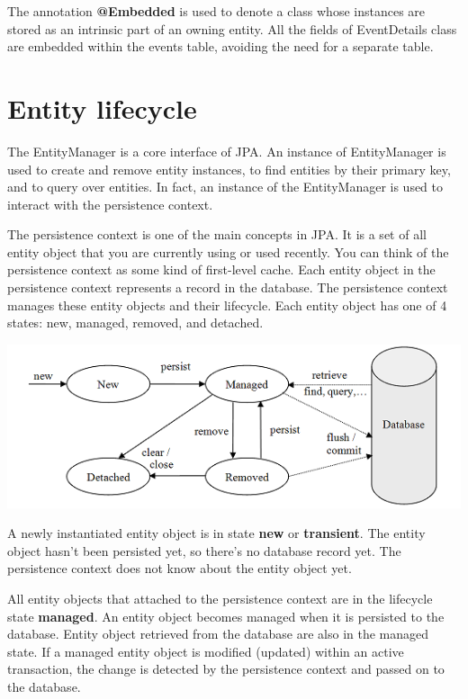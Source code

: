 The annotation \textbf{@Embedded}  is used to denote a class whose instances are stored as an intrinsic part of an owning entity.
 All the fields of EventDetails class are embedded within the events table, avoiding the need for a separate table.


\section{Entity lifecycle}

The EntityManager is a core interface of JPA.  An instance of EntityManager is used to create and remove  entity instances, to find entities by their primary key,  and to query over entities.  In fact,  an instance of the EntityManager is used to interact with the persistence context. 

The persistence context is one of the main concepts in JPA.
It is a set of all entity object that you are currently using or used recently. You can think of the persistence context as some kind of first-level cache. Each entity object in the persistence context represents a record in the database.
The persistence context manages these entity objects and their lifecycle. Each entity object has one of 4 states: new, managed, removed, and detached.

\includegraphics[width=\textwidth]{./images/chapter6/entity_states}

A newly instantiated entity object is in state \textbf{new} or \textbf{transient}. The entity object hasn't been persisted yet, so there's no database record yet. The persistence context does not know about the entity object yet. 

All entity objects that attached to the persistence context are in the lifecycle state \textbf{managed}. An entity object becomes managed when it is persisted to the database. Entity object retrieved from the database are also in the managed state.
If a managed entity object is modified (updated) within an active transaction, the change is detected by the persistence context and passed on to the database.

